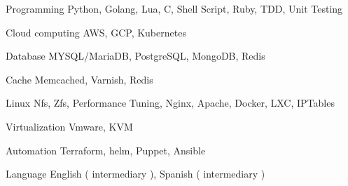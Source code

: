 

\begin{cvskills}

  \cvskill
    {Programming} %
    {Python, Golang, Lua, C, Shell Script, Ruby, TDD, Unit Testing} %

  \cvskill
    {Cloud computing} %
    {AWS, GCP, Kubernetes} %

  \cvskill
    {Database} %
    {MYSQL/MariaDB, PostgreSQL, MongoDB, Redis} %

  \cvskill
    {Cache} %
    {Memcached, Varnish, Redis} %

  \cvskill
    {Linux} %
    {Nfs, Zfs, Performance Tuning, Nginx, Apache, Docker, LXC, IPTables } %

\cvskill
    {Virtualization} %
    {Vmware, KVM} %

\cvskill
  {Automation} %
  {Terraform, helm, Puppet, Ansible} %

\cvskill
  {Language} %
  {English ( intermediary ), Spanish ( intermediary )} %

\end{cvskills}
